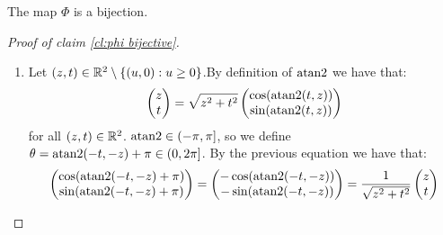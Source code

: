 \begin{claim} \label{cl:phi bijective}
    The map $\Phi$ is a bijection.
\end{claim}
\begin{proof}[Proof of claim \ref{cl:phi bijective}] \hfill
    \begin{enumerate}[align=left]
        \item[Surjectivity:] Let $(z, t) \in \mathbb{R}^2 \setminus \{(u, 0): u \geq 0\}$.By definition of $\operatorname{atan2}$ we have that:
              \[\begin{pmatrix}
                      z \\
                      t
                  \end{pmatrix}
                  = \sqrt{z^2 + t^2}
                  \begin{pmatrix}
                      \cos(\operatorname{atan2}(t,z)) \\
                      \sin(\operatorname{atan2}(t,z))
                  \end{pmatrix}\]
              for all $(z, t) \in \mathbb{R}^2$. $\operatorname{atan2} \in (-\pi, \pi]$, so we define $\theta = \operatorname{atan2}(-t, -z) + \pi \in (0, 2\pi]$. By the previous equation we have that:
              \begin{equation} \label{eq:atan theta}
                  \begin{pmatrix}
                      \cos(\operatorname{atan2}(-t, -z) + \pi) \\
                      \sin(\operatorname{atan2}(-t, -z) + \pi)
                  \end{pmatrix}
                  = \begin{pmatrix}
                      -\cos(\operatorname{atan2}(-t, -z)) \\
                      -\sin(\operatorname{atan2}(-t, -z))
                  \end{pmatrix}
                  = \frac{1}{\sqrt{z^2 + t^2}}
                  \begin{pmatrix}
                      z \\
                      t
                  \end{pmatrix}
              \end{equation}


\end{enumerate}
\end{proof}
